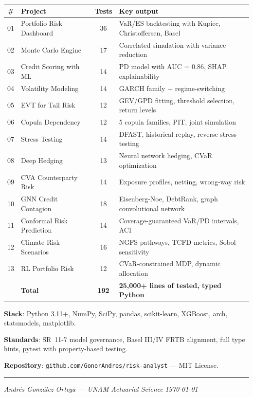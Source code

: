 \documentclass[11pt, a4paper]{article}
\begin{document}
\begin{center}
\begin{tabular}{@{}clcl@{}}
\toprule
\textbf{\#} & \textbf{Project} & \textbf{Tests} & \textbf{Key output} \\
\midrule
01 & Portfolio Risk Dashboard     & 36 & VaR/ES backtesting with Kupiec, Christoffersen, Basel \\
02 & Monte Carlo Engine           & 17 & Correlated simulation with variance reduction \\
03 & Credit Scoring with ML       & 14 & PD model with AUC = 0.86, SHAP explainability \\
04 & Volatility Modeling           & 14 & GARCH family + regime-switching \\
05 & EVT for Tail Risk            & 12 & GEV/GPD fitting, threshold selection, return levels \\
06 & Copula Dependency            & 12 & 5 copula families, PIT, joint simulation \\
07 & Stress Testing               & 14 & DFAST, historical replay, reverse stress testing \\
08 & Deep Hedging                 & 13 & Neural network hedging, CVaR optimization \\
09 & CVA Counterparty Risk        & 14 & Exposure profiles, netting, wrong-way risk \\
10 & GNN Credit Contagion         & 18 & Eisenberg-Noe, DebtRank, graph convolutional network \\
11 & Conformal Risk Prediction    & 14 & Coverage-guaranteed VaR/PD intervals, ACI \\
12 & Climate Risk Scenarios       & 16 & NGFS pathways, TCFD metrics, Sobol sensitivity \\
13 & RL Portfolio Risk            & 12 & CVaR-constrained MDP, dynamic allocation \\
\addlinespace
   & \textbf{Total}               & \textbf{192} & \textbf{25{,}000+ lines of tested, typed Python} \\
\bottomrule
\end{tabular}
\end{center}

\medskip

\noindent
\textbf{Stack}: Python 3.11+, NumPy, SciPy, pandas, scikit-learn, XGBoost, arch, statsmodels, matplotlib.

\noindent
\textbf{Standards}: SR~11-7 model governance, Basel III/IV FRTB alignment, full type hints, pytest with property-based testing.

\noindent
\textbf{Repository}: \texttt{github.com/GonorAndres/risk-analyst} --- MIT License.

\vfill
\hrule
\smallskip
\noindent\textit{Andr\'es Gonz\'alez Ortega --- UNAM Actuarial Science} \hfill \textit{\today}
\end{document}
